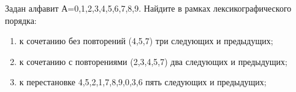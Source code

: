 \question 
Задан алфавит А={0,1,2,3,4,5,6,7,8,9}. Найдите в рамках лексикографического порядка:
\begin{enumerate}
\item  к сочетанию без повторений (4,5,7) три следующих и предыдущих;
\item  к сочетанию с повторениями (2,3,4,5,7) два следующих и предыдущих;
\item  к перестановке 4,5,2,1,7,8,9,0,3,6 пять следующих и предыдущих;
\end{enumerate}

